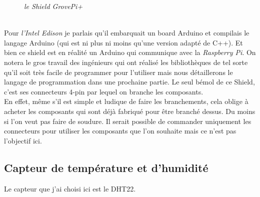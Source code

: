 \begin{figure}[H]
\begin{center}
\end{center}
	\caption{ \textit{le Shield GrovePi+}}
\end{figure}\\

Pour \textit{l'Intel Edison} je parlais qu'il embarquait un board Arduino et compilais le langage Arduino (qui est ni plus ni moins qu'une version adapté de C++). Et bien ce shield est en réalité un Arduino qui communique avec la \textit{Raspberry Pi}. On notera le gros travail des ingénieurs qui ont réalisé les bibliothèques de tel sorte qu'il soit très facile de programmer pour l'utiliser mais nous détaillerons le langage de programmation dans une prochaine partie. Le seul bémol de ce Shield, c'est ses connecteurs 4-pin par lequel on branche les composants.\\

En effet, même s'il est simple et ludique de faire les branchements, cela oblige à acheter les composants qui sont déjà fabriqué pour être branché dessus. Du moins si l'on veut pas faire de soudure. Il serait possible de commander uniquement les connecteurs pour utiliser les composants que l'on souhaite mais ce n'est pas l'objectif ici.\\

\subsection{Capteur de température et d'humidité}

Le capteur que j'ai choisi ici est le DHT22.\\

